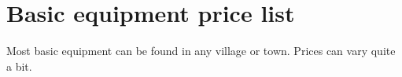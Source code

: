 
\goodbreak
{}
\section*{Basic equipment price list}

Most basic equipment can be found in any village or town. Prices can vary quite a bit.




